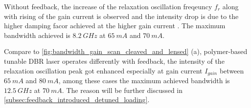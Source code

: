 Without feedback, the increase of the relaxation oscillation freqeuncy $f_r$ along with rising of the gain current is observed and the intensity drop is due to the higher damping facor achieved at the higher gain current \cite{petermann2012laser}. The maximum bandwidth achieved is $8.2 \ GHz$ at $65 \ mA$ and $70\ mA$.

Compare to \autoref{fig:bandwidth_gain_scan_cleaved_and_lensed} (a), polymer-based tunable DBR laser operates differently with feedback, the intensity of the relaxation oscillation peak got enhanced especially at gain current $I_{gain}$ between $65 \ mA$ and $80 \ mA$, among these cases the maximum achieved bandwidth is $12.5 \ GHz$ at $70 \ mA$. The reason will be further discussed in \autoref{subsec:feedback_introduced_detuned_loading}.






